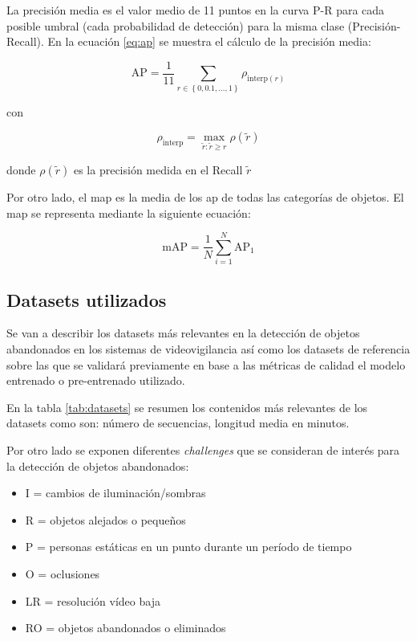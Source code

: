 La precisión media es el valor medio de 11 puntos en la curva P-R para cada posible umbral (cada probabilidad de detección) para la misma clase (Precisión-Recall). En la ecuación \ref{eq:ap} se muestra el cálculo de la precisión media:

\begin{equation}
\label{eq:ap}
\text{AP}=\frac{1}{11} \sum_{r\in \left \{ 0, 0.1, ...,1 \right \}}\rho_{\text{interp}\left ( r \right )}
\end{equation}

con

$$\rho_{\text{interp}} = \max_{\tilde{r}:\tilde{r} \geq r} \rho\left ( \tilde{r} \right )$$

donde $\rho\left ( \tilde{r} \right )$ es la precisión medida en el Recall $\tilde{r}$

Por otro lado, el \gls{map} es la media de los \gls{ap} de todas las categorías de objetos. El \gls{map} se representa mediante la siguiente ecuación:

\begin{equation}
\label{eq:map}
\text{mAP} = \frac{1}{N} \sum_{i=1}^{N} \text{AP}_{1}
\end{equation}

\subsection{Datasets utilizados}
\label{subsec:datasets-utilizados}

Se van a describir los datasets más relevantes en la detección de objetos abandonados en los sistemas de videovigilancia así como los datasets de referencia sobre las que se validará previamente en base a las métricas de calidad el modelo entrenado o pre-entrenado utilizado.

En la tabla \ref{tab:datasets} se resumen los contenidos más relevantes de los datasets como son: número de secuencias, longitud media en minutos.

Por otro lado se exponen diferentes \textit{challenges} que se consideran de interés para la detección de objetos abandonados:

\begin{itemize}
    \item I = cambios de iluminación/sombras
    \item R = objetos alejados o pequeños
    \item P = personas estáticas en un punto durante un período de tiempo
    \item O = oclusiones
    \item LR = resolución vídeo baja
    \item RO = objetos abandonados o eliminados
\end{itemize}

